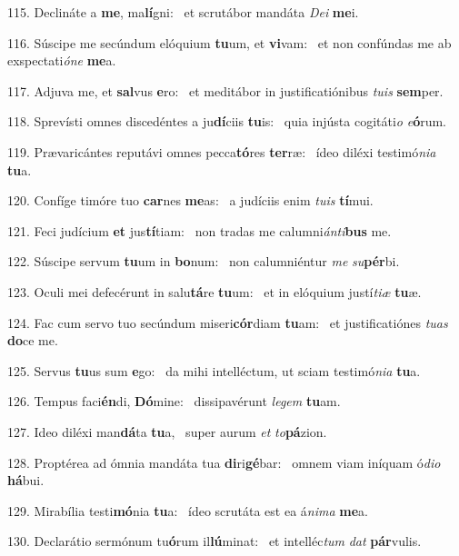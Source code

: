 115. Declináte a \textbf{me}, ma\textbf{lí}gni: \ast\  et scrutábor mandáta \textit{De}\textit{i} \textbf{me}i.\

116. Súscipe me secúndum elóquium \textbf{tu}um, et \textbf{vi}vam: \ast\  et non confúndas me ab exspectati\textit{ó}\textit{ne} \textbf{me}a.\

117. Adjuva me, et \textbf{sal}vus \textbf{e}ro: \ast\  et meditábor in justificatiónibus \textit{tu}\textit{is} \textbf{sem}per.\

118. Sprevísti omnes discedéntes a ju\textbf{dí}ciis \textbf{tu}is: \ast\  quia injústa cogitáti\textit{o} \textit{e}\textbf{ó}rum.\

119. Prævaricántes reputávi omnes pecca\textbf{tó}res \textbf{ter}ræ: \ast\  ídeo diléxi testimó\textit{ni}\textit{a} \textbf{tu}a.\

120. Confíge timóre tuo \textbf{car}nes \textbf{me}as: \ast\  a judíciis enim \textit{tu}\textit{is} \textbf{tí}mui.\

121. Feci judícium \textbf{et} jus\textbf{tí}tiam: \ast\  non tradas me calumni\textit{án}\textit{ti}\textbf{bus} me.\

122. Súscipe servum \textbf{tu}um in \textbf{bo}num: \ast\  non calumniéntur \textit{me} \textit{su}\textbf{pér}bi.\

123. Oculi mei defecérunt in salu\textbf{tá}re \textbf{tu}um: \ast\  et in elóquium justí\textit{ti}\textit{æ} \textbf{tu}æ.\

124. Fac cum servo tuo secúndum miseri\textbf{cór}diam \textbf{tu}am: \ast\  et justificatiónes \textit{tu}\textit{as} \textbf{do}ce me.\

125. Servus \textbf{tu}us sum \textbf{e}go: \ast\  da mihi intelléctum, ut sciam testimó\textit{ni}\textit{a} \textbf{tu}a.\

126. Tempus faci\textbf{én}di, \textbf{Dó}mine: \ast\  dissipavérunt \textit{le}\textit{gem} \textbf{tu}am.\

127. Ideo diléxi man\textbf{dá}ta \textbf{tu}a, \ast\  super aurum \textit{et} \textit{to}\textbf{pá}zion.\

128. Proptérea ad ómnia mandáta tua \textbf{di}ri\textbf{gé}bar: \ast\  omnem viam iníquam ó\textit{di}\textit{o} \textbf{há}bui.\

129. Mirabília testi\textbf{mó}nia \textbf{tu}a: \ast\  ídeo scrutáta est ea á\textit{ni}\textit{ma} \textbf{me}a.\

130. Declarátio sermónum tu\textbf{ó}rum il\textbf{lú}minat: \ast\  et intelléc\textit{tum} \textit{dat} \textbf{pár}vulis.\

